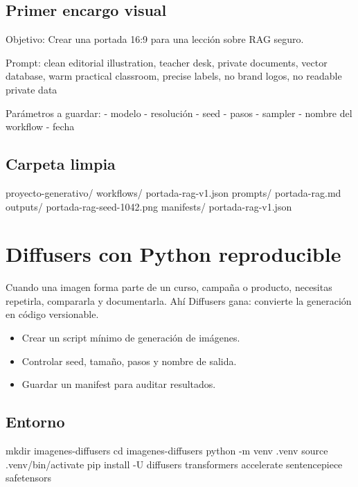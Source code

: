 \documentclass[11pt,a4paper]{book}
\begin{document}
\section{Primer encargo visual}
\begin{codebox}
Objetivo:
Crear una portada 16:9 para una lección sobre RAG seguro.

Prompt:
clean editorial illustration, teacher desk, private documents, vector database,
warm practical classroom, precise labels, no brand logos, no readable private data

Parámetros a guardar:
- modelo
- resolución
- seed
- pasos
- sampler
- nombre del workflow
- fecha
\end{codebox}
\section{Carpeta limpia}
\begin{codebox}
proyecto-generativo/
  workflows/
    portada-rag-v1.json
  prompts/
    portada-rag.md
  outputs/
    portada-rag-seed-1042.png
  manifests/
    portada-rag-v1.json
\end{codebox}
\chapter{Diffusers con Python reproducible}
Cuando una imagen forma parte de un curso, campaña o producto, necesitas repetirla, compararla y documentarla. Ahí Diffusers gana: convierte la generación en código versionable.

\begin{itemize}\item Crear un script mínimo de generación de imágenes.\end{itemize}
\begin{itemize}\item Controlar seed, tamaño, pasos y nombre de salida.\end{itemize}
\begin{itemize}\item Guardar un manifest para auditar resultados.\end{itemize}
\section{Entorno}
\begin{codebox}
mkdir imagenes-diffusers
cd imagenes-diffusers
python -m venv .venv
source .venv/bin/activate
pip install -U diffusers transformers accelerate sentencepiece safetensors
\end{codebox}
\end{document}

